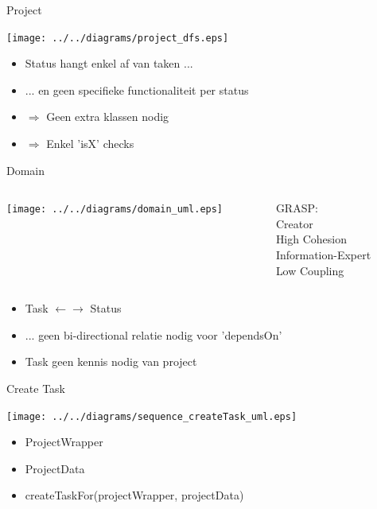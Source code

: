 \documentclass[mathserif,serif]{beamer}
\begin{document}
  \begin{frame}{Project}
      \begin{center}
      \texttt{[image: ../../diagrams/project\_dfs.eps]}
        \begin{itemize}
        \item Status hangt enkel af van taken ...
        \item ... en geen specifieke functionaliteit per status
        \item $\Rightarrow$ Geen extra klassen nodig
        \item $\Rightarrow$ Enkel 'isX' checks
        \end{itemize}
      \end{center}
  \end{frame}

  \begin{frame}{Domain}
      \begin{columns}[c]
        \begin{column}{0.70\textwidth}
      \texttt{[image: ../../diagrams/domain\_uml.eps]}
        \end{column}
        \begin{column}{0.30\textwidth}
          \begin{center}
            GRASP:\\
            Creator\\
            High Cohesion\\
            Information-Expert\\
            Low Coupling\\
          \end{center}
        \end{column}
      \end{columns}
      \begin{center}
        \begin{itemize}
        \item Task $\leftarrow$$\rightarrow$ Status
        \item ... geen bi-directional relatie nodig voor 'dependsOn'
        \item Task geen kennis nodig van project
        \end{itemize}
      \end{center}
  \end{frame}

  \begin{frame}{Create Task}
      \begin{center}
      \texttt{[image: ../../diagrams/sequence\_createTask\_uml.eps]}
        \begin{itemize}
        \item ProjectWrapper
        \item ProjectData
        \item createTaskFor(projectWrapper, projectData)
        \end{itemize}
      \end{center}
  \end{frame}
\end{document}
